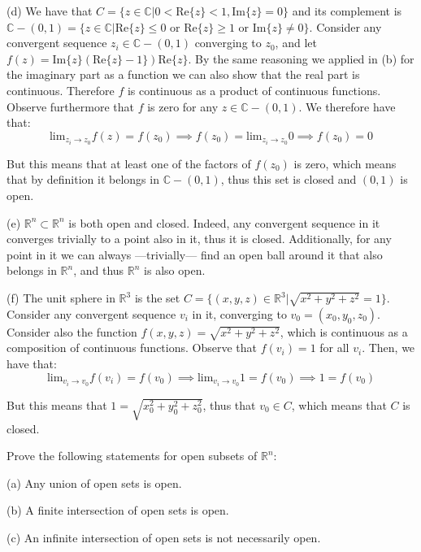 \begin{solution}
    (d) We have that $C = \{z \in \mathbb{C} \lvert 0 < \text{Re}\{z\} < 1, \text{Im}\{z\} = 0\}$ and its complement is $\mathbb{C} - (0, 1) = \{z \in \mathbb{C} \lvert \text{Re}\{z\} \leq 0 \text{ or } \text{Re}\{z\} \geq 1 \text{ or } \text{Im}\{z\} \neq 0\}$. Consider any convergent sequence $z_i \in \mathbb{C} - (0, 1)$ converging to $z_0$, and let $f(z) = \text{Im}\{z\}(\text{Re}\{z\} - 1\})\text{Re}\{z\}$. By the same reasoning we applied in (b) for the imaginary part as a function we can also show that the real part is continuous. Therefore $f$ is continuous as a product of continuous functions. Observe furthermore that $f$ is zero for any $z \in \mathbb{C} - (0, 1)$. We therefore have that:
    $$\text{lim}_{z_i \rightarrow z_0} f(z) = f(z_0) \implies f(z_0) = \text{lim}_{z_i \rightarrow z_0} 0 \implies f(z_0) = 0$$

    But this means that at least one of the factors of $f(z_0)$ is zero, which means that by definition it belongs in $\mathbb{C} - (0,1)$, thus this set is closed and $(0, 1)$ is open.

    (e) $\mathbb{R}^n \subset \mathbb{R}^n$ is both open and closed. Indeed, any convergent sequence in it converges trivially to a point also in it, thus it is closed. Additionally, for any point in it we can always ---trivially--- find an open ball around it that also belongs in $\mathbb{R}^n$, and thus $\mathbb{R}^n$ is also open.

    (f) The unit sphere in $\mathbb{R}^3$ is the set $C = \{(x, y, z) \in \mathbb{R}^3 \lvert \sqrt{x^2 + y^2 +z^2} = 1\}$. Consider any convergent sequence $v_i$ in it, converging to $v_0 = (x_0, y_0, z_0)$. Consider also the function $f(x, y, z) = \sqrt{x^2+y^2+z^2}$, which is continuous as a composition of continuous functions. Observe that $f(v_i) = 1$ for all $v_i$. Then, we have that:
    $$\text{lim}_{v_i \rightarrow v_0}f(v_i) = f(v_0) \implies \text{lim}_{v_i \rightarrow v_0} 1 = f(v_0) \implies 1 = f(v_0)$$

    But this means that $1 = \sqrt{x_0^2 + y_0^2 + z_0^2}$, thus that $v_0 \in C$, which means that $C$ is closed.

\end{solution}

\begin{exercise}{3}
    Prove the following statements for open subsets of $\mathbb{R}^n$:

    (a) Any union of open sets is open.

    (b) A finite intersection of open sets is open.

    (c) An infinite intersection of open sets is not necessarily open.
\end{exercise}

